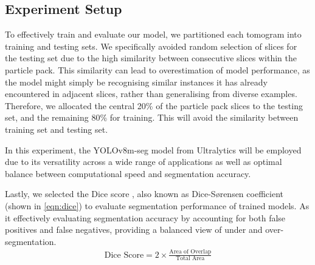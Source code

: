 \documentclass[preprint,12pt]{elsarticle}
\begin{document}
\subsection{Experiment Setup}
To effectively train and evaluate our model, we partitioned each tomogram into training and testing sets. 
We specifically avoided random selection of slices for the testing set due to the high similarity between consecutive slices within the particle pack. 
This similarity can lead to overestimation of model performance, as the model might simply be recognising similar instances it has already encountered in adjacent slices, rather than generalising from diverse examples. 
Therefore, we allocated the central 20\% of the particle pack slices to the testing set, and the remaining 80\% for training.
This will avoid the similarity between training set and testing set. 

In this experiment, the YOLOv8m-seg model from Ultralytics \citep{jocher2023yolo} will be employed due to its versatility across a wide range of applications as well as optimal balance between computational speed and segmentation accuracy.

Lastly, we selected the Dice score \cite{Dice1945MeasuresOT}, also known as Dice-Sørensen coefficient (shown in \cref{eqn:dice}) to evaluate segmentation performance of trained models.
As it effectively evaluating segmentation accuracy by accounting for both false positives and false negatives, providing a balanced view of under and over-segmentation.
\begin{align}
    \label{eqn:dice}
    \text{Dice Score} = 2 \times \frac{\text{Area of Overlap}}{\text{Total Area}}
\end{align}
\end{document}
